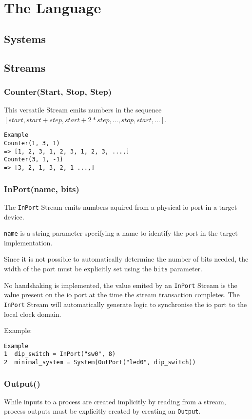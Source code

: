 \chapter{The Language}

\section{Systems}

\section{Streams}
\subsection{Counter(Start, Stop, Step)}
This versatile Stream emits numbers in the sequence
$[start, start + step, start + 2 * step, ..., stop, start, ...]$.


\begin{verbatim}
Example
Counter(1, 3, 1)
=> [1, 2, 3, 1, 2, 3, 1, 2, 3, ...,]
Counter(3, 1, -1)
=> [3, 2, 1, 3, 2, 1 ...,]
\end{verbatim}

\subsection{InPort(name, bits)}
The \verb|InPort| Stream emits numbers aquired from a physical io port in a
target device.

\verb|name| is a string parameter specifying a name to identify
the port in the target implementation.

Since it is not possible to automatically determine the number of bits needed,
the width of the port must be explicitly set using the \verb|bits| parameter.

No handshaking is implemented, the value emited by an
\verb|InPort| Stream is the value present on the io port at the time the
stream transaction completes. The \verb|InPort| Stream will automatically
generate logic to synchronise the io port to the local clock domain.

Example:
\begin{verbatim}
Example
1  dip_switch = InPort("sw0", 8)
2  minimal_system = System(OutPort("led0", dip_switch))
\end{verbatim}

\subsection{Output()}
While inputs to a process are created implicitly by reading from a stream,
process outputs must be explicitly created by creating an \verb|Output|.

